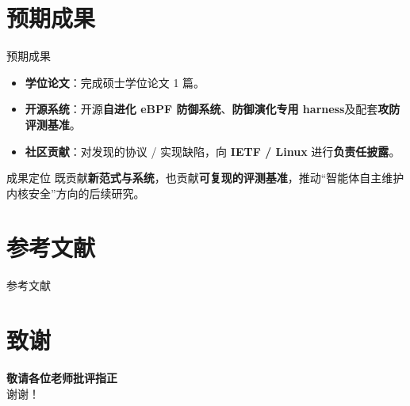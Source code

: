 \documentclass[aspectratio=169,10pt]{beamer}
\begin{document}
\section{预期成果}

\begin{frame}{预期成果}
    \begin{itemize}
        \item \textbf{学位论文}：完成硕士学位论文 1 篇。
        \item \textbf{开源系统}：开源\textbf{自进化 eBPF 防御系统}、\textbf{防御演化专用 harness}及配套\textbf{攻防评测基准}。
        \item \textbf{社区贡献}：对发现的协议 / 实现缺陷，向 \textbf{IETF / Linux} 进行\textbf{负责任披露}。
    \end{itemize}
    \vspace{0.6em}
    \begin{block}{成果定位}
        既贡献\textbf{新范式与系统}，也贡献\textbf{可复现的评测基准}，推动“智能体自主维护内核安全”方向的后续研究。
    \end{block}
\end{frame}


\section*{参考文献}

\begin{frame}[allowframebreaks]{参考文献}
    \printbibliography[heading=none]
\end{frame}


\section*{致谢}

\begin{frame}[plain]
    \begin{center}
        \vspace{1.5cm}
        {\Huge\bfseries\kaishu 敬请各位老师批评指正}\\[1.1cm]
        {\Large\kaishu 谢\quad 谢！}
    \end{center}
\end{frame}
\end{document}

